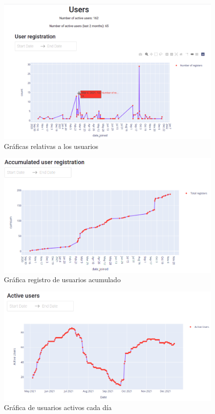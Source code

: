 \begin{figure}[H]
    \centering
    \includegraphics[width=16cm, keepaspectratio]{img/users.png}
    \caption{Gráficas relativas a los usuarios}
    \label{fig:users}
\end{figure}
\begin{figure}[H]
    \centering
    \includegraphics[width=16cm, keepaspectratio]{img/accumulated.png}
    \caption{Gráfica registro de usuarios acumulado}
    \label{fig:accumulated}
\end{figure}
\begin{figure}[H]
    \centering
    \includegraphics[width=16cm, keepaspectratio]{img/active.png}
    \caption{Gráfica de usuarios activos cada día}
    \label{fig:active}
\end{figure}


